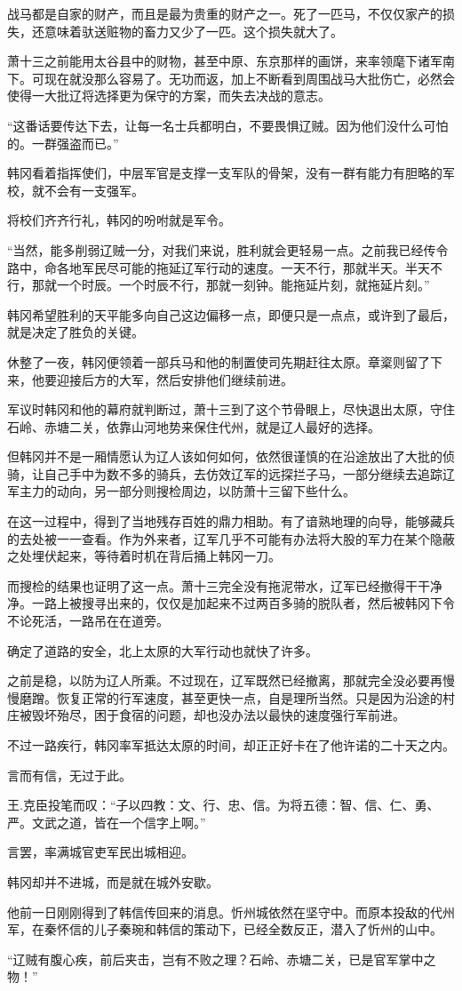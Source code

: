 战马都是自家的财产，而且是最为贵重的财产之一。死了一匹马，不仅仅家产的损失，还意味着驮送赃物的畜力又少了一匹。这个损失就大了。

萧十三之前能用太谷县中的财物，甚至中原、东京那样的画饼，来率领麾下诸军南下。可现在就没那么容易了。无功而返，加上不断看到周围战马大批伤亡，必然会使得一大批辽将选择更为保守的方案，而失去决战的意志。

“这番话要传达下去，让每一名士兵都明白，不要畏惧辽贼。因为他们没什么可怕的。一群强盗而已。”

韩冈看着指挥使们，中层军官是支撑一支军队的骨架，没有一群有能力有胆略的军校，就不会有一支强军。

将校们齐齐行礼，韩冈的吩咐就是军令。

“当然，能多削弱辽贼一分，对我们来说，胜利就会更轻易一点。之前我已经传令路中，命各地军民尽可能的拖延辽军行动的速度。一天不行，那就半天。半天不行，那就一个时辰。一个时辰不行，那就一刻钟。能拖延片刻，就拖延片刻。”

韩冈希望胜利的天平能多向自己这边偏移一点，即便只是一点点，或许到了最后，就是决定了胜负的关键。

休整了一夜，韩冈便领着一部兵马和他的制置使司先期赶往太原。章楶则留了下来，他要迎接后方的大军，然后安排他们继续前进。

军议时韩冈和他的幕府就判断过，萧十三到了这个节骨眼上，尽快退出太原，守住石岭、赤塘二关，依靠山河地势来保住代州，就是辽人最好的选择。

但韩冈并不是一厢情愿认为辽人该如何如何，依然很谨慎的在沿途放出了大批的侦骑，让自己手中为数不多的骑兵，去仿效辽军的远探拦子马，一部分继续去追踪辽军主力的动向，另一部分则搜检周边，以防萧十三留下些什么。

在这一过程中，得到了当地残存百姓的鼎力相助。有了谙熟地理的向导，能够藏兵的去处被一一查看。作为外来者，辽军几乎不可能有办法将大股的军力在某个隐蔽之处埋伏起来，等待着时机在背后捅上韩冈一刀。

而搜检的结果也证明了这一点。萧十三完全没有拖泥带水，辽军已经撤得干干净净。一路上被搜寻出来的，仅仅是加起来不过两百多骑的脱队者，然后被韩冈下令不论死活，一路吊在在道旁。

确定了道路的安全，北上太原的大军行动也就快了许多。

之前是稳，以防为辽人所乘。不过现在，辽军既然已经撤离，那就完全没必要再慢慢磨蹭。恢复正常的行军速度，甚至更快一点，自是理所当然。只是因为沿途的村庄被毁坏殆尽，困于食宿的问题，却也没办法以最快的速度强行军前进。

不过一路疾行，韩冈率军抵达太原的时间，却正正好卡在了他许诺的二十天之内。

言而有信，无过于此。

王.克臣投笔而叹：“子以四教：文、行、忠、信。为将五德：智、信、仁、勇、严。文武之道，皆在一个信字上啊。”

言罢，率满城官吏军民出城相迎。

韩冈却并不进城，而是就在城外安歇。

他前一日刚刚得到了韩信传回来的消息。忻州城依然在坚守中。而原本投敌的代州军，在秦怀信的儿子秦琬和韩信的策动下，已经全数反正，潜入了忻州的山中。

“辽贼有腹心疾，前后夹击，岂有不败之理？石岭、赤塘二关，已是官军掌中之物！”
